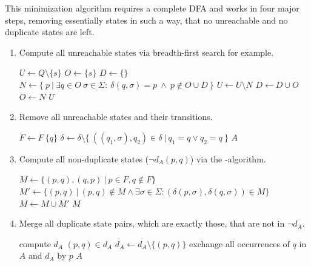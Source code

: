 This minimization algorithm requires a complete DFA and works in four major steps, removing essentially states in such a way, that no unreachable and no duplicate states are left.
\begin{enumerate}
	\item Compute all unreachable states via breadth-first search for example.
	
	\vspace{0.2cm}
	\begin{algorithmic}[1]
			\State $U \gets Q \setminus \{s\}$	
			\State $O \gets \{s\}$				
			\State $D \gets \{\}$				
				\State $N \gets \{\ p\ | \ \exists q \in O\ \sigma \in \Sigma \colon\ \delta(q, \sigma) = p\ \land\ p \notin O \cup D\ \}$
				\State $U \gets U \setminus N$
				\State $D \gets D \cup O$
				\State $O \gets N$
			\EndWhile
			\State \Return $U$
		\EndFunction
	\end{algorithmic}

	\item Remove all unreachable states and their transitions.
	
	\vspace{0.2cm}
	\begin{algorithmic}[1]
					\State $F \gets F \ \{q\}$
				\EndIf
				\State $\delta \gets \delta \setminus \{\ ((q_1, \sigma), q_2) \in \delta\ |\ q_1 = q \lor q_2 = q\ \}$
			\EndFor
			\State \Return $A$
		\EndFunction
	\end{algorithmic}

	\item Compute all non-duplicate states ($\neg d_A(p, q)$) via the \MinMark-algorithm.
	
	\vspace{0.2cm}
	\begin{algorithmic}[1]
		\State $M \gets \{ (p,q), (q,p)\ |\ p \in F, q \notin F \}$
		\Do
			\State $M' \gets \{ (p,q)\ |\ (p,q) \notin M \land \exists \sigma \in \Sigma \colon (\delta(p,\sigma), \delta(q,\sigma)) \in M \}$
			\State $M \gets M \cup M'$
		\State \Return $M$
		\EndFunction
	\end{algorithmic}

	\item Merge all duplicate state pairs, which are exactly those, that are not in $\neg d_A$.
	
	\vspace{0.2cm}
	\begin{algorithmic}[1]
			\State compute $d_A$
				\State $(p,q) \in d_A$
				\State $d_A \gets d_A \setminus \{ (p,q) \}$
					\State exchange all occurrences of $q$ in $A$ and $d_A$ by $p$
				\EndIf
			\EndWhile
			\State \Return $A$
		\EndFunction
	\end{algorithmic}
\end{enumerate}
